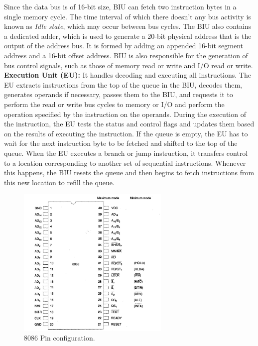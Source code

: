 \documentclass[12pt, a4paper]{scrartcl}
\begin{document}
	Since the data bus is of 16-bit size, BIU can fetch two instruction bytes in a single memory cycle. The time interval of which there doesn't any bus activity is known as \textit{Idle state}, which may occur between bus cycles. The BIU also contains a dedicated adder, which is used to generate a 20-bit physical address that is the output of the address bus. It is formed by adding an appended 16-bit segment address and a 16-bit offset address. BIU is also responsible for the generation of bus control signals, such as those of memory read or write and I/O read or write. \\
	
	\textbf{Execution Unit (EU): }It handles decoding and executing all instructions. The EU extracts instructions from the top of the queue in the BIU, decodes them, generates operands if necessary, passes them to the BIU, and requests it to perform the read or write bus cycles to memory or I/O and perform the operation specified by the instruction on the operands. During the execution of the instruction, the EU tests the status and control flags and updates them based on the results of executing the instruction. If the queue is empty, the EU has to wait for the next instruction byte to be fetched and shifted to the top of the queue. When the EU executes a branch or jump instruction, it transfers control to a location corresponding to another set of sequential instructions. Whenever this happens, the BIU resets the queue and then begins to fetch instructions from this new location to refill the queue.

	\begin{figure}[h]
		\centering
		\includegraphics[width=0.65\textwidth]{images/8086-pin-configuration.png}
		\caption{8086 Pin configuration.}
		\label{image-3}
	\end{figure}
\end{document}

